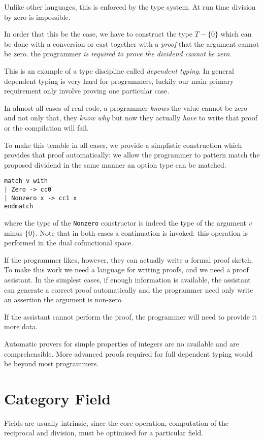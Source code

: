 Unlike other languages, this is enforced by the type system. At run time
division by zero is impossible.

In order that this be the case, we have to construct the type $T-\{0\}$
which can be done with a conversion or cast together with a {\em proof}
that the argument cannot be zero. the programmer {\em is required to prove
the dividend cannot be zero}.

This is an example of a type discipline called {\em dependent typing}.
In general dependent typing is very hard for programmers, luckily our
main primary requirement only involve proving one particular case.

In almost all cases of real code, a programmer {\em knows} the value
cannot be zero and not only that, they {\em know why} but now they
actually {\em have} to write that proof or the compilation will fail.

To make this tenable in all cases, we provide a simplistic construction
which provides that proof automatically: we allow the programmer
to pattern match the proposed dividend in the same manner an option
type can be matched.
\begin{verbatim}
match v with
| Zero -> cc0 
| Nonzero x -> cc1 x
endmatch
\end{verbatim}
where the type of the \verb$Nonzero$ constructor is indeed the type of
the argument $v$ minus $\{0\}$. Note that in both cases a continuation
is invoked: this operation is performed in the dual cofunctional space.

If the programmer likes, however, they can actually write a formal proof
sketch. To make this work we need a language for writing proofs, and
we need a proof assistant. In the simplest cases, if enough information
is available, the assistant can generate a correct proof automatically
and the programmer need only write an assertion the argument is
non-zero.

If the assistant cannot perform the proof, the programmer will
need to provide it more data.

Automatic provers for simple properties of integers are no available
and are comprehensible. More advanced proofs required for full
dependent typing would be beyond most programmers.


\section{Category Field}
Fields are usually intrinsic, since the core operation, computation
of the reciprocal and division, must be optimised for a particular
field.

